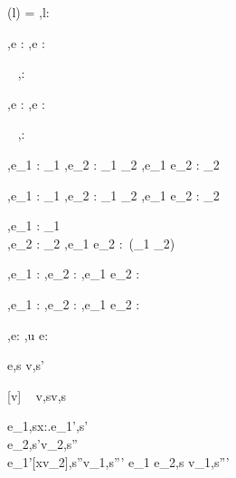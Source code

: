   {\Sigma(l) = \tau}
  {\Gamma,\Sigma\infers l:\Reference \tau}


  {\Gamma,\Sigma \infers e : \tau}
  {\Gamma,\Sigma \infers \Edit e : \Task \tau}

  {\ }
  {\Gamma,\Sigma \infers \Enter \tau : \Task \tau}

  {\Gamma,\Sigma \infers e : \Reference \tau}
  {\Gamma,\Sigma \infers \Update e : \Task \tau}


  {\ }
  {\Gamma,\Sigma \infers \Fail : \Task \tau}


  {\ontopof
    {\Gamma,\Sigma \infers e_1 : \Task \tau_1}
    {\Gamma,\Sigma \infers e_2 : \tau_1 \to \Task \tau_2}}
  {\Gamma,\Sigma \infers e_1 \Then e_2 : \Task \tau_2}


  {\ontopof
    {\Gamma,\Sigma \infers e_1 : \Task \tau_1}
    {\Gamma,\Sigma \infers e_2 : \tau_1 \to \Task \tau_2}}
  {\Gamma,\Sigma \infers e_1 \Next e_2 : \Task \tau_2}


  {\Gamma,\Sigma \infers e_1 : \Task \tau_1 \\
   \Gamma,\Sigma \infers e_2 : \Task \tau_2}
  {\Gamma,\Sigma \infers e_1 \And e_2 : \Task\,(\tau_1 \times \tau_2)}


  {\ontopof
    {\Gamma,\Sigma \infers e_1 : \Task \tau}
    {\Gamma,\Sigma \infers e_2 : \Task \tau}}
  {\Gamma,\Sigma \infers e_1 \Or e_2 : \Task \tau}


  {\ontopof
    {\Gamma,\Sigma \infers e_1 : \Task \tau}
    {\Gamma,\Sigma \infers e_2 : \Task \tau}}
  {\Gamma,\Sigma \infers e_1 \Xor e_2 : \Task \tau}


  {\Gamma,\Sigma\infers e:\Task\tau}
  {\Gamma,\Sigma\infers u \At e:\Task\tau}





  {e,s \evaluate v,s'}


[v\in{}]
  {\ }
  {v,s\evaluate v,s}

  {e_1,s\evaluate \lambda x:\tau.e_1',s'\\
   e_2,s'\evaluate v_2,s''\\
   e_1'[x\mapsto v_2],s''\evaluate v_1,s'''}
  {e_1 e_2,s \evaluate v_1,s'''}


